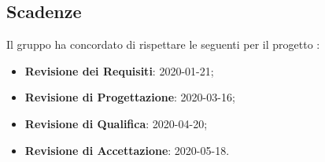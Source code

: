 \subsection{Scadenze}
Il gruppo \Gruppo{} ha concordato di rispettare le seguenti  per il progetto \NomeProgetto{}:
\begin{itemize}
    \item \textbf{Revisione dei Requisiti}: 2020-01-21;
    \item \textbf{Revisione di Progettazione}: 2020-03-16;
    \item \textbf{Revisione di Qualifica}: 2020-04-20;
    \item \textbf{Revisione di Accettazione}: 2020-05-18.
\end{itemize}